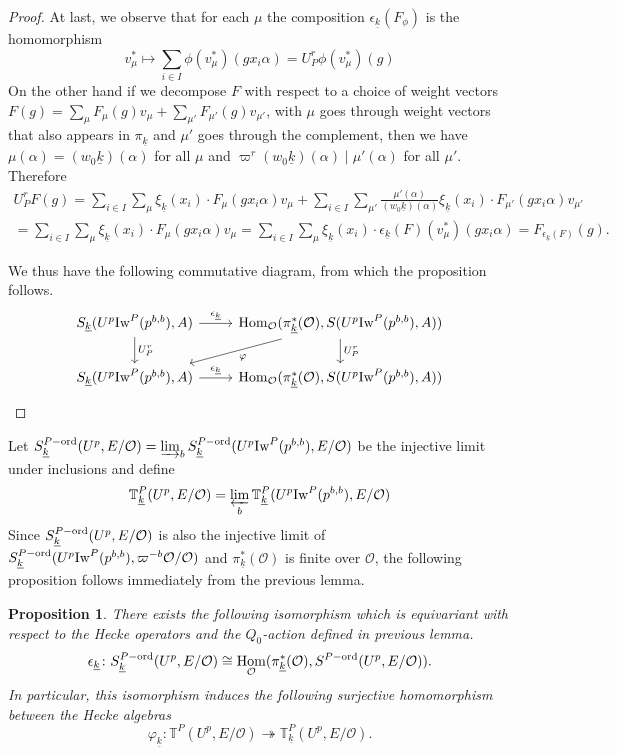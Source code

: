 \documentclass[leqno]{amsart}
\newcommand{\wt}[1]{\underline{ #1 }}
\newcommand{\TT}{\mathbb{T}} %
\newcommand{\Iw}{\textnormal{Iw}}
\newcommand{\ord}{\textnormal{ord}}
\newcommand{\oo}{\mathcal{O}} %
\DeclareMathOperator{\Hom}{Hom}
\newtheorem{prop}[thm]{Proposition}
\theoremstyle{definition}
\theoremstyle{remark}
\begin{document}
\begin{proof}
	At last, we observe that for each $\mu$ 
	the composition
	$\epsilon_{\wt{k}}(F_\phi)$ is the homomorphism
	\[
		v_\mu^*\mapsto \sum_{i\in I}\phi(v_\mu^*)
		(gx_i\alpha) =U_P^r\phi(v_\mu^*)(g)
	\]
	On the other hand 
	if we decompose $F$ with respect to a choice of 
	weight vectors
	$F(g)=\sum_\mu F_\mu(g)v_\mu+
	\sum_{\mu'}F_{\mu'}(g)v_{\mu'}$, 
	with $\mu$ goes through weight vectors 
	that also appears in $\pi_{\wt{k}}$
	and $\mu'$ goes through the complement,
	then we have
	$\mu(\alpha)=(w_0\wt{k})(\alpha)$ for all $\mu$
	and  $\varpi^r(w_0\wt{k})(\alpha)\mid \mu'(\alpha)$
	for all $\mu'$.
	Therefore
	\begin{multline*}
	U_P^rF(g)=
	\sum_{i\in I}
	\sum_\mu \xi_{\wt{k}}(x_i)\cdot F_\mu(gx_i\alpha)v_\mu+
	\sum_{i\in I}
	\sum_{\mu'}\frac{\mu'(\alpha)}{(w_0\wt{k})(\alpha)}
	\xi_{\wt{k}}(x_i)\cdot F_{\mu'}(gx_i\alpha)v_{\mu'}\\=
	\sum_{i\in I}
	\sum_\mu \xi_{\wt{k}}(x_i)\cdot F_\mu(gx_i\alpha)v_\mu=
	\sum_{i\in I}
	\sum_\mu \xi_{\wt{k}}(x_i)\cdot
	\epsilon_{\wt{k}}(F)(v^*_\mu)(gx_i\alpha)
	=F_{\epsilon_{\wt{k}}(F)}(g).
	\end{multline*}

	We thus have the following commutative diagram,
	from which the proposition follows.
	\[
	\begin{tikzcd}
		S_{\wt{k}}(U^p\Iw^P(p^{b,b}),A)
		\arrow[r,"\epsilon_{\wt{k}}"]
		\arrow[d,"U_P^r"]
		& \Hom_\oo(\pi^*_{\wt{k}}(\oo), S(U^p\Iw^P(p^{b,b}),A))
		\arrow[d,"U_P^r"]
		\arrow[dl,"\varphi"]\\
		S_{\wt{k}}(U^p\Iw^P(p^{b,b}),A)
		\arrow[r,"\epsilon_{\wt{k}}"]
		& \Hom_\oo(\pi^*_{\wt{k}}(\oo), S(U^p\Iw^P(p^{b,b}),A))
	\end{tikzcd}	
	\]
\end{proof}


Let $S_{\wt{k}}^{P-\ord}(U^p,E/\oo)=
\varinjlim_{b}
S_{\wt{k}}^{P-\ord}(U^p\Iw^P(p^{b,b}),E/\oo)$
be the injective limit under inclusions
and define 
\[
	\TT^P_{\wt{k}}(U^p,E/\oo)=
	\varprojlim_{b}
	\TT^P_{\wt{k}}(U^p\Iw^P(p^{b,b}),E/\oo)
\]
Since $S_{\wt{k}}^{P-\ord}(U^p,E/\oo)$
is also the injective limit of 
$S_{\wt{k}}^{P-\ord}(U^p\Iw^P(p^{b,b}),\varpi^{-b}\oo/\oo)$
and $\pi_{\wt{k}}^*(\oo)$ is finite over $\oo$,
the following proposition
follows immediately from the previous lemma.

\begin{prop}\label{prop:wt_indep}
	There exists the following isomorphism
	which is equivariant with respect to the 
	Hecke operators and the $Q_0$-action 
	defined in previous lemma.
	\[
		\epsilon_{\wt{k}} \colon 
		S_{\wt{k}}^{P-\ord}(U^p,E/\oo)\cong 
		\Hom_{\oo}(\pi_{\wt{k}}^*(\oo),
		S^{P-\ord}(U^p,E/\oo)).
	\]
	In particular, this isomorphism 
	induces the following surjective homomorphism
	between the Hecke algebras
	\[
		\varphi_{\wt{k}}\colon 
		\TT^P(U^p,E/\oo)\twoheadrightarrow
		\TT^P_{\wt{k}}(U^p,E/\oo).
	\]
\end{prop}
\end{document}
